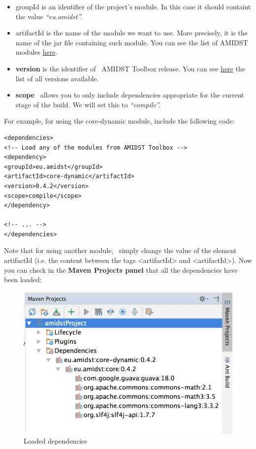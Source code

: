 \documentclass[10pt,a4paper]{article}
\begin{document}
\begin{itemize}
	\item
	{groupId} is an identifier of the project's module. In this case it
	should containt the value \emph{``eu.amidst''.}
	\item
	{artifactId }is the name of the module we want to use. More precisely,
	it is the name of the jar file containing such module. You can see the
	list of AMIDST modules
	\href{https://github.com/amidst/toolbox/tree/mvn-repo/eu/amidst}{here}.
	\item
	\textbf{version} is the identifier of~ AMIDST Toolbox release. You can
	see
	\href{mohttps://github.com/amidst/toolbox/blob/master/CHANGELOG.mddules\%20here}{here}
	the list of all versions available.
	\item
	\textbf{scope}~ allows you to only include dependencies appropriate
	for the current stage of the build. We will set this to
	\emph{``compile''.}
\end{itemize}

\noindent For example, for using the {core-dynamic }module, include the
following code:

\begin{verbatim}
<dependencies>
<!-- Load any of the modules from AMIDST Toolbox -->
<dependency>
<groupId>eu.amidst</groupId>
<artifactId>core-dynamic</artifactId>
<version>0.4.2</version>
<scope>compile</scope>
</dependency>

<!-- ... -->
</dependencies>        
\end{verbatim}

Note that for using another module,~ simply change the value of the
element artifactId{ }(i.e. the content between the tags
\textless{}artifactId\textgreater{} and
\textless{}artifactId\textgreater{}). Now you can check in the \textbf{Maven Projects panel} that all the
dependencies have been loaded:


\begin{figure}[h!]
	\centering	
	\includegraphics[width=12cm]{img/use_amidst07.png}
	\caption{Loaded dependencies}
\end{figure}
\end{document}
